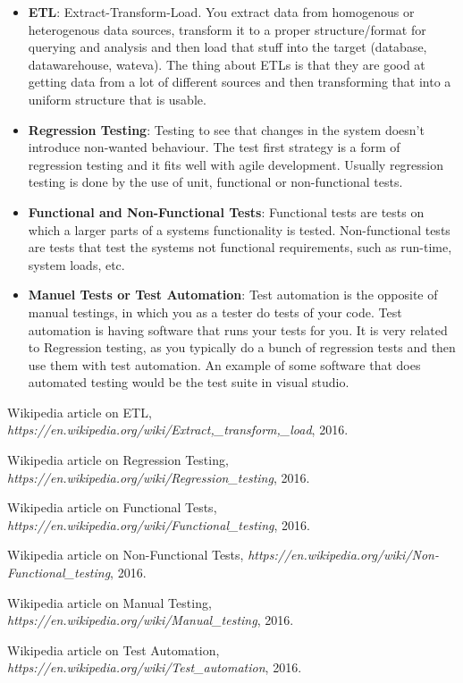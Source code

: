 \documentclass[a4paper,12pt]{article}
\begin{document}
\begin{itemize}
\item \textbf{ETL}: Extract-Transform-Load. You extract data from homogenous or heterogenous data sources, transform it to a proper structure/format for querying and analysis and then load that stuff into the target (database, datawarehouse, wateva).
  The thing about ETLs is that they are good at getting data from a lot of different sources and then transforming that into a uniform structure that is usable. \cite{wiki-etl}

\item \textbf{Regression Testing}: Testing to see that changes in the system doesn't introduce non-wanted behaviour. The test first strategy is a form of regression testing and it fits well with agile development. Usually regression testing is done by the use of unit, functional or non-functional tests. \cite{wiki-regression}

\item \textbf{Functional and Non-Functional Tests}: Functional tests are tests on which a larger parts of a systems functionality is tested. Non-functional tests are tests that test the systems not functional requirements, such as run-time, system loads, etc. \cite{wiki-functional, wiki-nonfunctional}

\item \textbf{Manuel Tests or Test Automation}: Test automation is the opposite of manual testings, in which you as a tester do tests of your code. Test automation is having software that runs your tests for you. It is very related to Regression testing, as you typically do a bunch of regression tests and then use them with test automation. An example of some software that does automated testing would be the test suite in visual studio. \cite{wiki-manual, wiki-automation}
\end{itemize}



\begin{thebibliography}{9}

  Wikipedia article on ETL,
  \emph{https://en.wikipedia.org/wiki/Extract,\_transform,\_load},
  2016.

  Wikipedia article on Regression Testing,
  \emph{https://en.wikipedia.org/wiki/Regression\_testing},
  2016.

  Wikipedia article on Functional Tests,
  \emph{https://en.wikipedia.org/wiki/Functional\_testing},
  2016.

  Wikipedia article on Non-Functional Tests,
  \emph{https://en.wikipedia.org/wiki/Non-Functional\_testing},
  2016.

  Wikipedia article on Manual Testing,
  \emph{https://en.wikipedia.org/wiki/Manual\_testing},
  2016.

  Wikipedia article on Test Automation,
  \emph{https://en.wikipedia.org/wiki/Test\_automation},
  2016.  
\end{thebibliography}
\end{document}
